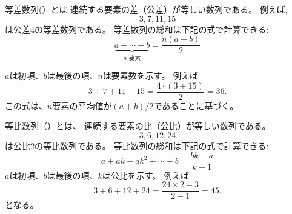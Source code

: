 \begin{comment}
An \key{arithmetic progression} is a \index{arithmetic progression}
sequence of numbers
where the difference between any two consecutive
numbers is constant.
For example,
\[3, 7, 11, 15\]
is an arithmetic progression with constant 4.
The sum of an arithmetic progression can be calculated
using the formula
\[\underbrace{a + \cdots + b}_{n \,\, \textrm{numbers}} = \frac{n(a+b)}{2}\]
where $a$ is the first number,
$b$ is the last number and
$n$ is the amount of numbers.
For example,
\[3+7+11+15=\frac{4 \cdot (3+15)}{2} = 36.\]
The formula is based on the fact
that the sum consists of $n$ numbers and
the value of each number is $(a+b)/2$ on average.
\end{comment}

等差数列(）とは
連続する要素の差（公差）が等しい数列である。
例えば,
\[3, 7, 11, 15\]
は公差4の等差数列である。
等差数列の総和は下記の式で計算できる:
\[\underbrace{a + \cdots + b}_{n \,\, \textrm{要素}} = \frac{n(a+b)}{2}\]

$a$は初項、$b$は最後の項、$n$は要素数を示す。
例えば
\[3+7+11+15=\frac{4 \cdot (3+15)}{2} = 36.\]
この式は、$n$要素の平均値が$(a+b)/2$であることに基づく。

\begin{comment}
\index{geometric progression}
A \key{geometric progression} is a sequence
of numbers
where the ratio between any two consecutive
numbers is constant.
For example,
\[3,6,12,24\]
is a geometric progression with constant 2.
The sum of a geometric progression can be calculated
using the formula
\[a + ak + ak^2 + \cdots + b = \frac{bk-a}{k-1}\]
where $a$ is the first number,
$b$ is the last number and the
ratio between consecutive numbers is $k$.
For example,
\[3+6+12+24=\frac{24 \cdot 2 - 3}{2-1} = 45.\]
\end{comment}

等比数列（）とは、
連続する要素の比（公比）が等しい数列である。
\[3,6,12,24\]
は公比2の等比数列である。
等比数列の総和は下記の式で計算できる:
\[a + ak + ak^2 + \cdots + b = \frac{bk-a}{k-1}\]
$a$は初項、$b$は最後の項、$k$は公比を示す。
例えば
\[3+6+12+24=\frac{24 \times 2 - 3}{2-1} = 45.\]
となる。

\begin{comment}
This formula can be derived as follows. Let
\[ S = a + ak + ak^2 + \cdots + b .\]
By multiplying both sides by $k$, we get
\[ kS = ak + ak^2 + ak^3 + \cdots + bk,\]
and solving the equation
\[ kS-S = bk-a\]
yields the formula.

A special case of a sum of a geometric progression is the formula
\[1+2+4+8+\ldots+2^{n-1}=2^n-1.\]
\end{comment}


